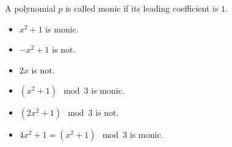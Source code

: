 \begin{frame}
\begin{definition}A polynomial $p$ is called monic if its leading coefficient is $1$.
\end{definition}

\begin{example}
\begin{itemize}
\item $x^2+1$ is monic.
\item $-x^2+1$ is not.
\item $2x$ is not.

\item $(x^2+1) \mod 3$ is monic.
\item $(2x^2+1) \mod 3$ is not.
\item $4x^2+1 = (x^2+1) \mod 3$ is monic.
\end{itemize}
\end{example}
\end{frame}